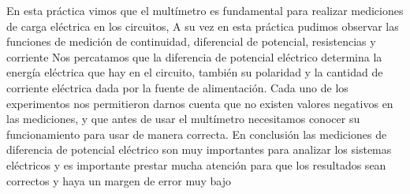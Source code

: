 \documentclass[10pt]{article}
\begin{document}
\begin{multicols}{2}
En esta práctica vimos que el multímetro es fundamental para realizar mediciones de carga eléctrica en los circuitos, A su vez en esta práctica pudimos observar las funciones de medición de continuidad, diferencial de potencial, resistencias y corriente 
Nos percatamos que la diferencia de potencial eléctrico determina la energía eléctrica que hay en el circuito, también su polaridad y la cantidad de corriente eléctrica dada por la fuente de alimentación. 
Cada uno de los experimentos nos permitieron darnos cuenta que no existen valores negativos en las mediciones, y que antes de usar el multímetro necesitamos conocer su funcionamiento para usar de manera correcta. 
En conclusión las mediciones de diferencia de potencial eléctrico son muy importantes para analizar los sistemas eléctricos y es importante prestar mucha atención para que los resultados sean correctos y haya un margen de error muy bajo

\end{multicols}
\end{document}
